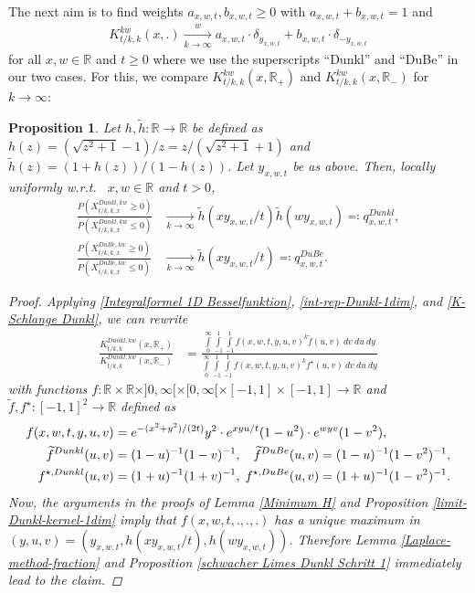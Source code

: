 \documentclass[reqno]{amsart}
\theoremstyle{plain}
\newtheorem{proposition}[theorem]{Proposition}
\theoremstyle{definition}
\numberwithin{equation}{section}
\newcommand{\R}{\mathbb{R}}
\begin{document}
The next aim is to find weights $a_{x,w,t}, b_{x,w,t} \geq 0$ with $a_{x,w,t}+b_{x,w,t}=1$ and
\begin{align}\label{schwacher Limes Dunkl Schritt 2}
K_{t/k,k}^{kw}(x,.) \xrightarrow[k \to \infty]{w} a_{x,w,t} \cdot \delta_{y_{x,w,t}} + b_{x,w,t} \cdot \delta_{-y_{x,w,t}}
\end{align}
for all $x,w \in \R$ and $t \geq 0$ where we use the superscripts ``Dunkl'' and ``DuBe'' in our two cases.
For this, 
we compare $K_{t/k,k}^{kw}(x,\R_+)$ and $K_{t/k,k}^{kw}(x,\R_-)$ for $k \to \infty$:

\begin{proposition}\label{schwacher Limes Dunkl Schritt 3}
Let $h,\widetilde{h}:\R \to \R$ be defined as $h(z)=(\sqrt{z^2+1}-1)/z=z/(\sqrt{z^2+1}+1)$ and $\widetilde{h}(z)=(1+h(z))/(1-h(z))$. 
Let $y_{x,w,t}$ be  as above.
Then, locally uniformly w.r.t.~ $x,w \in \R$ and $t>0$,
\begin{align}
\frac{P(X^{Dunkl,kw}_{t/k,k,x} \geq 0)}{P(X^{Dunkl,kw}_{t/k,k,x} \leq 0)} 
&\xrightarrow[k \to \infty]{} \widetilde{h}(x y_{x,w,t} / t) \widetilde{h}(w y_{x,w,t}) \eqqcolon q^{Dunkl}_{x,w,t}, 
\label{q Dunkl} \\
\frac{P(X^{DuBe,kw}_{t/k,k,x} \geq 0)}{P(X^{DuBe,kw}_{t/k,k,x} \leq 0)} 
&\xrightarrow[k \to \infty]{} \widetilde{h}(x y_{x,w,t} / t) \eqqcolon q^{DuBe}_{x,w,t}.
\label{q DuBe}
\end{align}
\begin{proof}
Applying \eqref{Integralformel 1D Besselfunktion}, \eqref{int-rep-Dunkl-1dim}, and \eqref{K-Schlange Dunkl},
we can rewrite
\begin{align*}
\frac{K_{t/k,k}^{Dunkl,kw}(x,\R_+)}{K_{t/k,k}^{Dunkl,kw}(x,\R_-)}
&= \frac
{\int\limits_0^{\infty} \int\limits_{-1}^1 \int\limits_{-1}^1 f(x,w,t,y,u,v)^k \widetilde{f}(u,v) \>dv \>du \>dy}
{\int\limits_0^{\infty} \int\limits_{-1}^1 \int\limits_{-1}^1 f(x,w,t,y,u,v)^k f^{\star}(u,v) \>dv \>du \>dy}
\end{align*}
with functions $f: \R \times \R \times]0,\infty[ \times [0,\infty[ \times [-1,1] \times [-1,1] \to \R$ and $\widetilde{f}, f^{\star}:[-1,1]^2 \to \R$ defined as
\begin{align*}
f(x,w,t,y,u,v)&=e^{-(x^2+y^2)/(2t)} y^2 \cdot e^{xyu/t} (1-u^2) \cdot e^{wyv} (1-v^2),  \\
\widetilde{f}^{Dunkl}(u,v)&=(1-u)^{-1} (1-v)^{-1}, \; \mkern11.6mu \widetilde{f}^{DuBe}(u,v)=(1-u)^{-1} (1-v^2)^{-1}, \\
f^{\star,Dunkl}(u,v)&=(1+u)^{-1} (1+v)^{-1}, \; f^{\star,DuBe}(u,v)=(1+u)^{-1} (1-v^2)^{-1}.
\end{align*}
Now, the arguments in the proofs of Lemma \ref{Minimum H} and Proposition \ref{limit-Dunkl-kernel-1dim} imply 
that $f(x,w,t,.,.,.)$ has a unique maximum in $(y,u,v)=(y_{x,w,t},h(xy_{x,w,t}/t),h(wy_{x,w,t}))$.
Therefore Lemma \ref{Laplace-method-fraction} and Proposition \ref{schwacher Limes Dunkl Schritt 1} immediately lead to the claim.
\end{proof}
\end{proposition}
\end{document}
